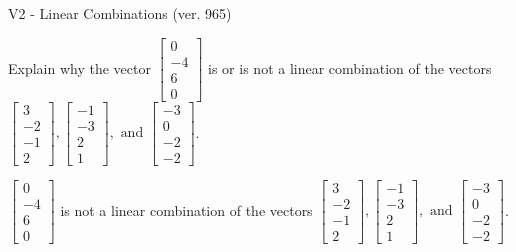 \begin{exercise}
  \begin{exerciseTitle}V2 - Linear Combinations (ver. 965)\end{exerciseTitle}
  \begin{exerciseStatement}
    Explain why the vector \(\left[\begin{array}{c}
0 \\
-4 \\
6 \\
0
\end{array}\right]\)  is or is not a linear 
	combination of the vectors \(\left[\begin{array}{c}
3 \\
-2 \\
-1 \\
2
\end{array}\right] , \left[\begin{array}{c}
-1 \\
-3 \\
2 \\
1
\end{array}\right] , \text{ and } \left[\begin{array}{c}
-3 \\
0 \\
-2 \\
-2
\end{array}\right]\).
	


  \end{exerciseStatement}
  \begin{exerciseAnswer}
   \(\left[\begin{array}{c}
0 \\
-4 \\
6 \\
0
\end{array}\right]\) 
  	 is not  
	a linear combination of the vectors \(\left[\begin{array}{c}
3 \\
-2 \\
-1 \\
2
\end{array}\right] , \left[\begin{array}{c}
-1 \\
-3 \\
2 \\
1
\end{array}\right] , \text{ and } \left[\begin{array}{c}
-3 \\
0 \\
-2 \\
-2
\end{array}\right]\).

	
  


  \end{exerciseAnswer}
\end{exercise}
